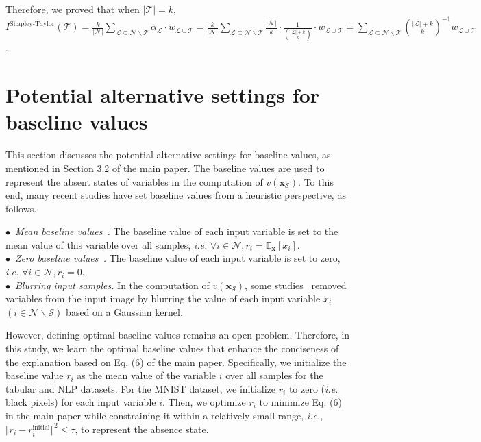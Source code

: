 Therefore, we proved that when {\small$|\mathcal{T}|=k$}, {\small$I^{\textrm{Shapley-Taylor}}(\mathcal{T})=\frac{k}{|\mathcal{N}|}\sum_{\mathcal{L}\subseteq \mathcal{N}\backslash \mathcal{T}}\alpha_\mathcal{L}\cdot  w_{\mathcal{L}\cup \mathcal{T}} =\frac{k}{|\mathcal{N}|}\sum_{\mathcal{L}\subseteq \mathcal{N}\backslash \mathcal{T}}\frac{|\mathcal{N}|}{k}\cdot\frac{1}{\binom{|\mathcal{L}|+k}{k}}\cdot  w_{\mathcal{L}\cup \mathcal{T}} =\sum_{\mathcal{L}\subseteq \mathcal{N}\backslash \mathcal{T}}\binom{|\mathcal{L}|+k}{k}^{-1} w_{\mathcal{L}\cup \mathcal{T}} $}.


\section{Potential alternative settings for baseline values}
\label{sec:app-alternative-baseline-value}

This section discusses the potential alternative settings for baseline values, as mentioned in Section 3.2 of the main paper.
The baseline values are used to represent the absent states of variables in the computation of {\small$v(\boldsymbol{x}_{\mathcal{S}})$}. 
To this end, many recent studies have set baseline values from a heuristic perspective, as follows.

\noindent$\bullet$~\textit{Mean baseline values~\cite{dabkowski2017real}.}
The baseline value of each input variable is set to the mean value of this variable over all samples, \emph{i.e.} {\small$\forall i\in \mathcal{N}, r_i=\mathbb{E}_{\boldsymbol{x}}[x_i]$}.\\
$\bullet$~\textit{Zero baseline values~\cite{ancona2019explaining,sundararajan2017axiomatic}.}
The baseline value of each input variable is set to zero, \emph{i.e.} {\small$\forall i\in \mathcal{N}, r_i=0$}.\\
$\bullet$~\textit{Blurring input samples.}
In the computation of {\small$v(\boldsymbol{x}_{\mathcal{S}})$}, some studies~\cite{fong2017interpretable,fong2019understanding} removed variables from the input image by blurring the value of each input variable {\small $x_i$} {\small $(i\in \mathcal{N}\backslash \mathcal{S})$} based on a Gaussian kernel.

However, defining optimal baseline values remains an open problem.
Therefore, in this study, we learn the optimal baseline values that enhance the conciseness of the explanation based on Eq. (6) of the main paper.
Specifically, we initialize the baseline value {\small$r_i$} as the mean value of the variable {\small$i$} over all samples for the tabular and NLP datasets.
For the MNIST dataset, we initialize {\small$r_i$} to zero (\emph{i.e.} black pixels) for each input variable {\small$i$}.
Then, we optimize {\small$r_i$} to minimize Eq. (6) in the main paper while constraining it within a relatively small range, \emph{i.e.}, {\small$\Vert r_i\!-\!r_i^{\text{initial}}\Vert^2\!\leq\! \tau$}, to represent the absence state.

